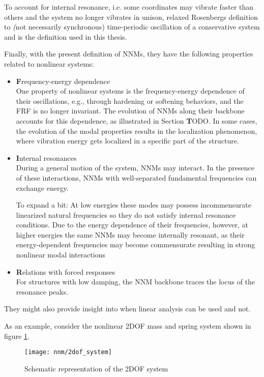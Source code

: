 To account for internal resonance, i.e. some coordinates may vibrate faster than
others and the system no longer vibrates in unison, \autocite{kerschen2009a}
relaxed Rosenbergs definition to {\textit (not necessarily synchronous)
  time-periodic oscillation of a conservative system} and is the definition used
in this thesis.


Finally, with the present definition of NNMs, they have the following properties
related to nonlinear systems:

\begin{itemize}
\item {\textbf Frequency-energy dependence}\\
  One property of nonlinear systems is the frequency-energy dependence of their
  oscillations, e.g., through hardening or softening behaviors, and the FRF is
  no longer invariant.
  The evolution of NNMs along their backbone accounts for this dependence, as
  illustrated in Section {\textbf TODO}. In some cases, the evolution of the modal
  properties results in the localization phenomenon, where vibration energy gets
  localized in a specific part of the structure.
\item {\textbf Internal resonances}\\
  During a general motion of the system, NNMs may interact. In the presence of
  these interactions, NNMs with well-separated fundamental frequencies can
  exchange energy.

  To expand a bit: At low energies these modes may possess incommensurate
  linearized natural frequencies so they do not satisfy internal resonance
  conditions. Due to the energy dependence of their frequencies, however, at
  higher energies the same NNMs may become internally resonant, as their
  energy-dependent frequencies may become commensurate resulting in strong
  nonlinear modal interactions
\item {\textbf Relations with forced responses}\\
  For structures with low damping, the NNM backbone traces the locus of the
  resonance peaks.
\end{itemize}

They might also provide insight into when linear analysis can be used and not.



As an example, consider the nonlinear 2DOF mass and spring system shown in
figure \ref{fig:2dof_system}.

\begin{figure}[!ht]
  \centering
  \texttt{[image: nnm/2dof\_system]}
  \caption{Schematic representation of the 2DOF system}
  \label{fig:2dof_system}
\end{figure}

